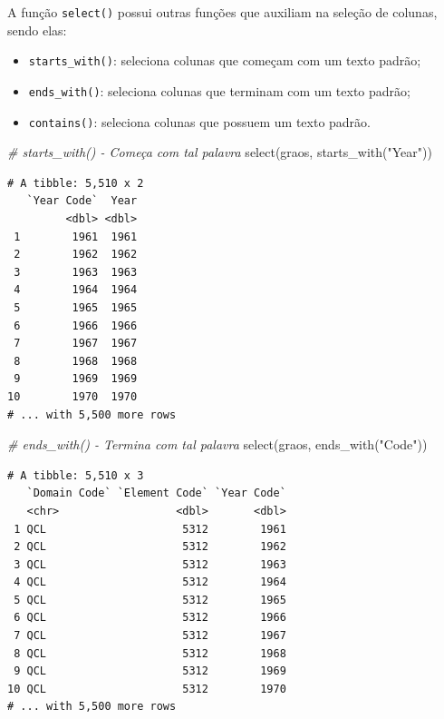 \documentclass[
  brazilian,
]{book}
\newenvironment{Shaded}{\begin{snugshade}}{\end{snugshade}}
\newcommand{\CommentTok}[1]{\textcolor[rgb]{0.56,0.35,0.01}{\textit{#1}}}
\newcommand{\FunctionTok}[1]{\textcolor[rgb]{0.00,0.00,0.00}{#1}}
\newcommand{\NormalTok}[1]{#1}
\newcommand{\StringTok}[1]{\textcolor[rgb]{0.31,0.60,0.02}{#1}}
\begin{document}
A função \texttt{select()} possui outras funções que auxiliam na seleção de colunas, sendo elas:

\begin{itemize}
\item
  \texttt{starts\_with()}: seleciona colunas que começam com um texto padrão;
\item
  \texttt{ends\_with()}: seleciona colunas que terminam com um texto padrão;
\item
  \texttt{contains()}: seleciona colunas que possuem um texto padrão.
\end{itemize}

\begin{Shaded}
\begin{Highlighting}[]
\CommentTok{\# starts\_with() {-} Começa com tal palavra}
\FunctionTok{select}\NormalTok{(graos, }\FunctionTok{starts\_with}\NormalTok{(}\StringTok{"Year"}\NormalTok{))}
\end{Highlighting}
\end{Shaded}

\begin{verbatim}
# A tibble: 5,510 x 2
   `Year Code`  Year
         <dbl> <dbl>
 1        1961  1961
 2        1962  1962
 3        1963  1963
 4        1964  1964
 5        1965  1965
 6        1966  1966
 7        1967  1967
 8        1968  1968
 9        1969  1969
10        1970  1970
# ... with 5,500 more rows
\end{verbatim}

\begin{Shaded}
\begin{Highlighting}[]
\CommentTok{\# ends\_with() {-} Termina com tal palavra}
\FunctionTok{select}\NormalTok{(graos, }\FunctionTok{ends\_with}\NormalTok{(}\StringTok{"Code"}\NormalTok{))}
\end{Highlighting}
\end{Shaded}

\begin{verbatim}
# A tibble: 5,510 x 3
   `Domain Code` `Element Code` `Year Code`
   <chr>                  <dbl>       <dbl>
 1 QCL                     5312        1961
 2 QCL                     5312        1962
 3 QCL                     5312        1963
 4 QCL                     5312        1964
 5 QCL                     5312        1965
 6 QCL                     5312        1966
 7 QCL                     5312        1967
 8 QCL                     5312        1968
 9 QCL                     5312        1969
10 QCL                     5312        1970
# ... with 5,500 more rows
\end{verbatim}
\end{document}
